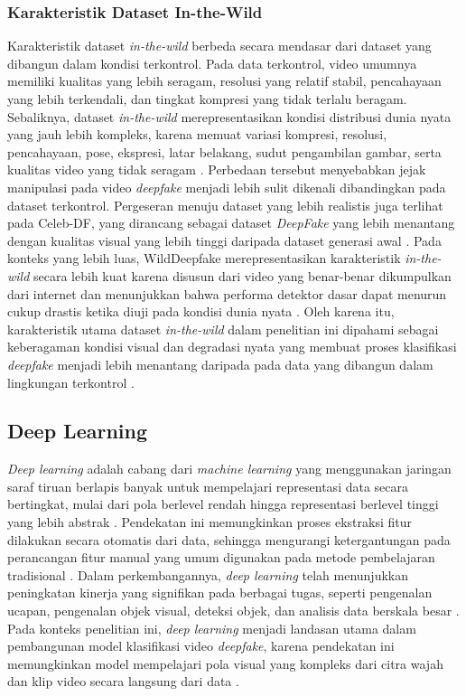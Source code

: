 \subsubsection{Karakteristik Dataset In-the-Wild} \label{II.Teori1.3}
Karakteristik dataset \textit{in-the-wild} berbeda secara mendasar dari dataset yang dibangun dalam kondisi terkontrol. Pada data terkontrol, video umumnya memiliki kualitas yang lebih seragam, resolusi yang relatif stabil, pencahayaan yang lebih terkendali, dan tingkat kompresi yang tidak terlalu beragam. Sebaliknya, dataset \textit{in-the-wild} merepresentasikan kondisi distribusi dunia nyata yang jauh lebih kompleks, karena memuat variasi kompresi, resolusi, pencahayaan, pose, ekspresi, latar belakang, sudut pengambilan gambar, serta kualitas video yang tidak seragam \cite{Zi2024,li2020celebdflargescalechallengingdataset}. Perbedaan tersebut menyebabkan jejak manipulasi pada video \textit{deepfake} menjadi lebih sulit dikenali dibandingkan pada dataset terkontrol. Pergeseran menuju dataset yang lebih realistis juga terlihat pada Celeb-DF, yang dirancang sebagai dataset \textit{DeepFake} yang lebih menantang dengan kualitas visual yang lebih tinggi daripada dataset generasi awal \cite{li2020celebdflargescalechallengingdataset}. Pada konteks yang lebih luas, WildDeepfake merepresentasikan karakteristik \textit{in-the-wild} secara lebih kuat karena disusun dari video yang benar-benar dikumpulkan dari internet dan menunjukkan bahwa performa detektor dasar dapat menurun cukup drastis ketika diuji pada kondisi dunia nyata \cite{Zi2024}. Oleh karena itu, karakteristik utama dataset \textit{in-the-wild} dalam penelitian ini dipahami sebagai keberagaman kondisi visual dan degradasi nyata yang membuat proses klasifikasi \textit{deepfake} menjadi lebih menantang daripada pada data yang dibangun dalam lingkungan terkontrol \cite{Zi2024,li2020celebdflargescalechallengingdataset}. \par

\subsection{Deep Learning} \label{II.Teori2}
\textit{Deep learning} adalah cabang dari \textit{machine learning} yang menggunakan jaringan saraf tiruan berlapis banyak untuk mempelajari representasi data secara bertingkat, mulai dari pola berlevel rendah hingga representasi berlevel tinggi yang lebih abstrak \cite{LeCun2015}. Pendekatan ini memungkinkan proses ekstraksi fitur dilakukan secara otomatis dari data, sehingga mengurangi ketergantungan pada perancangan fitur manual yang umum digunakan pada metode pembelajaran tradisional \cite{LeCun2015}. Dalam perkembangannya, \textit{deep learning} telah menunjukkan peningkatan kinerja yang signifikan pada berbagai tugas, seperti pengenalan ucapan, pengenalan objek visual, deteksi objek, dan analisis data berskala besar \cite{LeCun2015}. Pada konteks penelitian ini, \textit{deep learning} menjadi landasan utama dalam pembangunan model klasifikasi video \textit{deepfake}, karena pendekatan ini memungkinkan model mempelajari pola visual yang kompleks dari citra wajah dan klip video secara langsung dari data \cite{LeCun2015,Voulodimos2018}. \par

